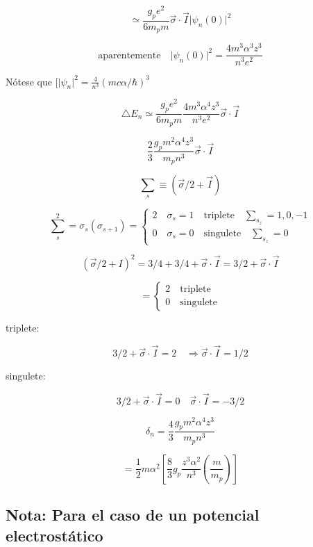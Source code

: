 \documentclass{report}
\begin{document}
\[\simeq \frac{g_p e^2 }{6 m_p m} \overrightarrow{\sigma} \cdot \overrightarrow{I} \vert \psi_n (0) \vert ^2 \]

\[\text{aparentemente} \quad \vert \psi_n (0) \vert ^2 = \frac{4 m^3 \alpha ^3 z^3}{n^3 e^2 }\]

Nótese que $[\vert \psi_n \vert ^2 = \frac{4}{n^3} (m c \alpha/\hbar)^3 $

\[\bigtriangleup E_n \simeq \frac{g_p e^2}{6 m_p m} \frac{4 m^3 \alpha^4 z^3 }{n^3 e^2 } \overrightarrow{\sigma} \cdot \overrightarrow{I} \]

\[\frac{2}{3} \frac{g_p m^2 \alpha ^4 z^3 }{m_p n^3} \overrightarrow{\sigma} \cdot \overrightarrow{I}\]

\[\sum _s \equiv (\overrightarrow{\sigma}/2 + \overrightarrow{I})\]

\[\sum _s ^2 = \sigma _s (\sigma _{s +1}) = \begin{cases}
                        2 \quad \sigma_s = 1 \quad  \text{triplete} \quad \sum _{s_{z}} = 1,0,-1 \\
                        0 \quad \sigma_s = 0 \quad  \text{singulete} \quad \sum _{s_{z}} = 0 
                    \end{cases}\]

\[(\overrightarrow{\sigma}/2+I)^2 = 3/4 + 3/4 + \overrightarrow{\sigma} \cdot \overrightarrow{I} = 3/2 + \overrightarrow{\sigma} \cdot \overrightarrow{I}\]

\[ = \begin{cases}
                        2 \quad   \text{triplete}  \\
                        0 \quad  \text{singulete}  
                    \end{cases}\]

triplete:

\[3/2 + \overrightarrow{\sigma} \cdot \overrightarrow{I} = 2 \quad \Rightarrow \overrightarrow{\sigma} \cdot \overrightarrow{I} = 1/2 \]

singulete:

\[3/2 + \overrightarrow{\sigma} \cdot \overrightarrow{I} = 0 \quad \overrightarrow{\sigma} \cdot \overrightarrow{I} = -3/2\]

\[\delta _n = \frac{4}{3} \frac{g_p m^2 \alpha ^4 z^3 }{m_p n^3 }\]

\[= \frac{1}{2} m \alpha^2 [\frac{8}{3} g_p \frac{z^3 \alpha ^2}{n^3} (\frac{m}{m_p })] \]

\subsection{Nota: Para el caso de un potencial electrost\'atico }
\end{document}
